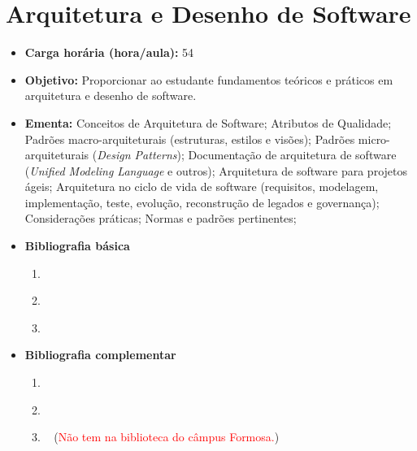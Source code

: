 \documentclass[11pt,fleqn]{book} %
\begin{document}
\section{Arquitetura e Desenho de Software}\label{2_arqsoft}
\begin{itemize}
	\item \textbf{Carga horária (hora/aula):} 54
	\item \textbf{Objetivo:} Proporcionar ao estudante fundamentos teóricos e práticos em arquitetura e desenho de software.
	\item \textbf{Ementa:} 
	Conceitos de Arquitetura de Software;
	Atributos de Qualidade;
	Padrões macro-arquiteturais (estruturas, estilos e visões);
	Padrões micro-arquiteturais (\textit{Design Patterns});
	Documentação de arquitetura de software (\textit{Unified Modeling Language} e outros);
	Arquitetura de software para projetos ágeis;
	Arquitetura no ciclo de vida de software (requisitos, modelagem, implementação, teste, evolução, reconstrução de legados e governança);
	Considerações práticas;
	Normas e padrões pertinentes;
	\item \textbf{Bibliografia básica}
	\begin{enumerate}
		\item ~\cite{sommerville2011engenharia}
		\item ~\cite{pressman2016engenharia}
		\item ~\cite{booch2012uml}
	\end{enumerate}
	\item \textbf{Bibliografia complementar}
	\begin{enumerate}
		\item ~\cite{wazlawick2011analise}
		\item ~\cite{larman2007utilizando}
		\item ~\cite{prikladnicki2014metodos} (\textcolor{red}{Não tem na biblioteca do câmpus Formosa.})
	\end{enumerate}
\end{itemize}


\newpage
\end{document}
